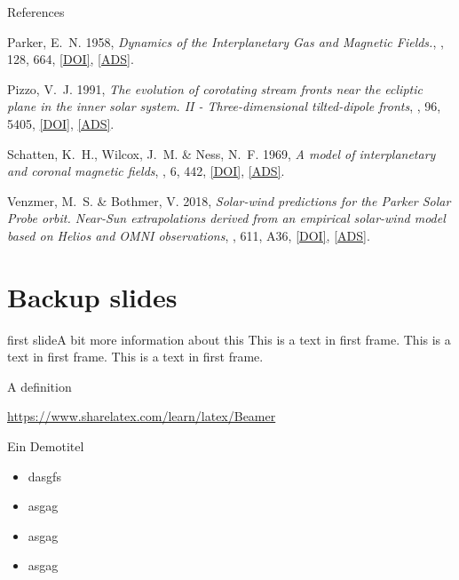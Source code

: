 \documentclass[11pt,aspectratio=1610]{beamer}	%
\begin{document}
\begin{frame}[t,allowframebreaks]{References}
\begin{thebibliography}{10}
			{Parker}, E.~N. 1958, \emph{{Dynamics of the Interplanetary Gas and Magnetic Fields.}}, \apj, 128, 664, \href{http://dx.doi.org/10.1086/146579}{[DOI]}, \href{http://adsabs.harvard.edu/abs/1958ApJ...128..664P}{[ADS]}.

			{Pizzo}, V.~J. 1991, \emph{{The evolution of corotating stream fronts near the
			ecliptic plane in the inner solar system. II - Three-dimensional
			tilted-dipole fronts}}, \jgr, 96, 5405,
			\href{http://dx.doi.org/10.1029/91JA00155}{[DOI]},
			\href{http://adsabs.harvard.edu/abs/1991JGR....96.5405P}{[ADS]}.
			
			{Schatten}, K.~H., {Wilcox}, J.~M. \& {Ness}, N.~F. 1969, \emph{{A model of
			interplanetary and coronal magnetic fields}}, \solphys, 6, 442,
			\href{http://dx.doi.org/10.1007/BF00146478}{[DOI]},
			\href{http://adsabs.harvard.edu/abs/1969SoPh....6..442S}{[ADS]}.

			{Venzmer}, M.~S. \& {Bothmer}, V. 2018, \emph{{Solar-wind predictions for the
			Parker Solar Probe orbit. Near-Sun extrapolations derived from an empirical
			solar-wind model based on Helios and OMNI observations}}, \aap, 611, A36,
			\href{http://dx.doi.org/10.1051/0004-6361/201731831}{[DOI]},
			\href{http://adsabs.harvard.edu/abs/2018A\%26A...611A..36V}{[ADS]}.

	\end{thebibliography}
\end{frame}


\appendix

\section{Backup slides}

\begin{frame}[c]{first slide}{A bit more information about this}
	This is a text in first frame. \pause This is a text in first frame. This is a text in first frame.
	\begin{definition}
		A definition
	\end{definition}
	\url{https://www.sharelatex.com/learn/latex/Beamer}
\end{frame}

\begin{frame}[<+->]{Ein Demotitel}{}
	\begin{itemize}
		\item<1-> dasgfs
		\item<2> asgag
		\item<3-> asgag
		\item asgag
	\end{itemize}
\end{frame}
\end{document}

